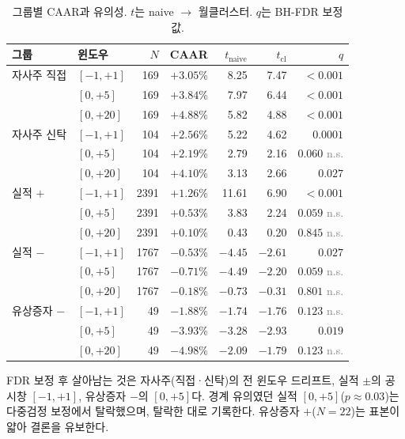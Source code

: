 \documentclass[11pt,a4paper]{article}
\newcommand{\sig}[1]{\textbf{#1}}
\newcommand{\ns}{\textcolor{gray}{n.s.}}
\begin{document}
\begin{table}[htbp]
\centering
\caption{그룹별 CAAR과 유의성. $t$는 naive $\to$ 월클러스터. $q$는 BH-FDR 보정값.}
\small
\begin{tabular}{llrrrrr}
\toprule
그룹 & 윈도우 & $N$ & CAAR & $t_{\text{naive}}$ & $t_{\text{cl}}$ & $q$ \\
\midrule
자사주 직접 & $[-1,+1]$ & 169 & $+3.05\%$ & 8.25 & 7.47 & \sig{$<0.001$} \\
             & $[0,+5]$  & 169 & $+3.84\%$ & 7.97 & 6.44 & \sig{$<0.001$} \\
             & $[0,+20]$ & 169 & \sig{$+4.88\%$} & 5.82 & 4.88 & \sig{$<0.001$} \\
\addlinespace
자사주 신탁 & $[-1,+1]$ & 104 & $+2.56\%$ & 5.22 & 4.62 & \sig{$0.0001$} \\
             & $[0,+5]$  & 104 & $+2.19\%$ & 2.79 & 2.16 & $0.060$ \ns \\
             & $[0,+20]$ & 104 & \sig{$+4.10\%$} & 3.13 & 2.66 & \sig{$0.027$} \\
\addlinespace
실적 $+$ & $[-1,+1]$ & 2391 & $+1.26\%$ & 11.61 & 6.90 & \sig{$<0.001$} \\
         & $[0,+5]$  & 2391 & $+0.53\%$ & 3.83 & 2.24 & $0.059$ \ns \\
         & $[0,+20]$ & 2391 & $+0.10\%$ & 0.43 & 0.20 & $0.845$ \ns \\
\addlinespace
실적 $-$ & $[-1,+1]$ & 1767 & $-0.53\%$ & $-4.45$ & $-2.61$ & \sig{$0.027$} \\
         & $[0,+5]$  & 1767 & $-0.71\%$ & $-4.49$ & $-2.20$ & $0.059$ \ns \\
         & $[0,+20]$ & 1767 & $-0.18\%$ & $-0.73$ & $-0.31$ & $0.801$ \ns \\
\addlinespace
유상증자 $-$ & $[-1,+1]$ & 49 & $-1.88\%$ & $-1.74$ & $-1.76$ & $0.123$ \ns \\
             & $[0,+5]$  & 49 & $-3.93\%$ & $-3.28$ & $-2.93$ & \sig{$0.019$} \\
             & $[0,+20]$ & 49 & $-4.98\%$ & $-2.09$ & $-1.79$ & $0.123$ \ns \\
\bottomrule
\end{tabular}
\end{table}

FDR 보정 후 살아남는 것은 자사주(직접·신탁)의 전 윈도우 드리프트, 실적 $\pm$의 공시창
$[-1,+1]$, 유상증자 $-$의 $[0,+5]$다. 경계 유의였던 실적 $[0,+5]$($p\approx0.03$)는 다중검정
보정에서 탈락했으며, 탈락한 대로 기록한다. 유상증자 $+$($N=22$)는 표본이 얇아 결론을 유보한다.
\end{document}
